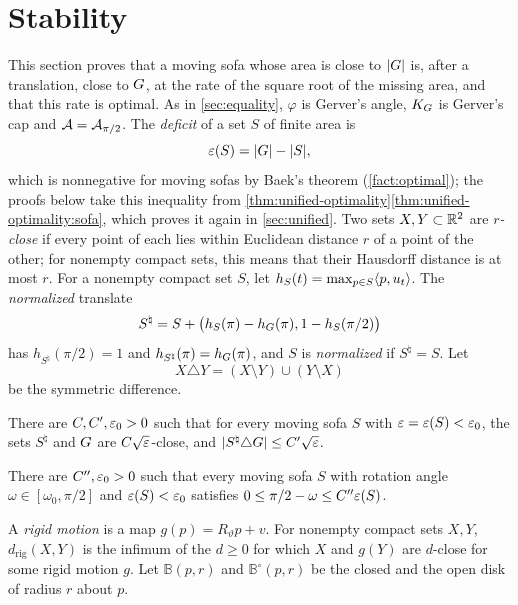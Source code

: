 \section{Stability}\label{sec:stability}

This section proves that a moving sofa whose area is close to $\lvert G\rvert$ is,
after a translation, close to $G$, at the rate of the square root of the
missing area, and that this rate is optimal. As in \cref{sec:equality},
$\varphi$ is Gerver's angle, $K_G$ is Gerver's cap and $\mathcal{A}=\mathcal{A}_{\pi/2}$. The
\emph{deficit} of a set $S$ of finite area is
\[
  \varepsilon(S)=\lvert G\rvert-\lvert S\rvert,
\]
which is nonnegative for moving sofas by Baek's theorem (\cref{fact:optimal});
the proofs below take this inequality from
\cref{thm:unified-optimality}\ref{thm:unified-optimality:sofa}, which proves it
again in \cref{sec:unified}. Two sets
$X,Y\subset\mathbb{R}^2$ are \emph{$r$-close} if every point of each lies within
Euclidean distance $r$ of a point of the other; for nonempty compact sets, this
means that their Hausdorff distance is at most $r$. For a nonempty compact set
$S$, let $h_S(t)=\max_{p\in S}\langle p,u_t\rangle$. The \emph{normalized} translate
\[
  S^\natural=S+\bigl(h_S(\pi)-h_G(\pi),1-h_S(\pi/2)\bigr)
\]
has $h_{S^\natural}(\pi/2)=1$ and $h_{S^\natural}(\pi)=h_G(\pi)$, and $S$ is
\emph{normalized} if $S^\natural=S$. Let
\[
  X\triangle Y=(X\setminus Y)\cup(Y\setminus X)
\]
be the symmetric difference.

\begin{theorem}\label{thm:stability}
There are $C,C',\varepsilon_0>0$ such that for every moving sofa $S$ with
$\varepsilon=\varepsilon(S)<\varepsilon_0$, the sets $S^\natural$ and $G$ are
$C\sqrt{\varepsilon}$-close, and $\lvert S^\natural\triangle G\rvert\le C'\sqrt{\varepsilon}$.
\end{theorem}

\begin{theorem}\label{thm:stability-angle}
There are $C'',\varepsilon_0>0$ such that every moving sofa $S$ with rotation angle
$\omega\in[\omega_0,\pi/2]$ and $\varepsilon(S)<\varepsilon_0$ satisfies
$0\le\pi/2-\omega\le C''\varepsilon(S)$.
\end{theorem}

A \emph{rigid motion} is a map $g(p)=R_\vartheta p+v$. For nonempty compact
sets $X,Y$, $d_{\mathrm{rig}}(X,Y)$ is the infimum of the $d\ge0$ for which
$X$ and $g(Y)$ are $d$-close for some rigid motion $g$. Let $\mathbb B(p,r)$
and $\mathbb B^\circ(p,r)$ be the closed and the open disk of radius $r$ about
$p$.

